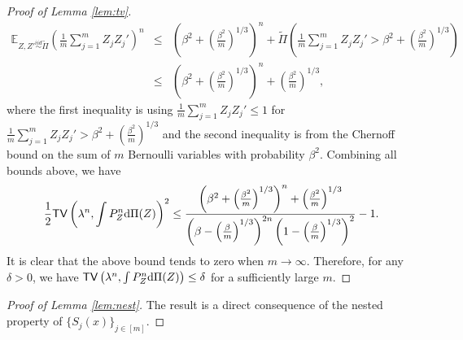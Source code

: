 \begin{proof}[Proof of Lemma \ref{lem:tv}]
\begin{eqnarray*}
 \mathbb{E}_{Z,Z'\stackrel{iid}{\sim} \tilde{\Pi}}\left(\frac{1}{m}\sum_{j=1}^mZ_jZ_j'\right)^n 
&\leq& \left(\beta^2 + \left(\frac{\beta^2}{m}\right)^{1/3}\right)^n + \tilde{\Pi}\left(\frac{1}{m}\sum_{j=1}^mZ_jZ_j'>\beta^2 + \left(\frac{\beta^2}{m}\right)^{1/3}\right) \\
&\leq& \left(\beta^2 + \left(\frac{\beta^2}{m}\right)^{1/3}\right)^n + \left(\frac{\beta^2}{m}\right)^{1/3},
\end{eqnarray*}
where the first inequality is using $\frac{1}{m}\sum_{j=1}^mZ_jZ_j' \leq 1$ for $\frac{1}{m}\sum_{j=1}^mZ_jZ_j' > \beta^2 + \left(\frac{\beta^2}{m}\right)^{1/3}$ and the second inequality is from the Chernoff bound on the sum of $m$ Bernoulli variables with probability $\beta^2$.
Combining all bounds above, we have
$$\frac{1}{2}{\sf TV}\left(\lambda^n,\int P_Z^n \mathrm{d}\Pi(Z)\right)^2\leq \frac{\left(\beta^2 + \left(\frac{\beta^2}{m}\right)^{1/3}\right)^n + \left(\frac{\beta^2}{m}\right)^{1/3}}{\left(\beta-\left(\frac{\beta}{m}\right)^{1/3}\right)^{2n}\left(1-\left(\frac{\beta}{m}\right)^{1/3}\right)^{2}}-1.$$
It is clear that the above bound tends to zero when $m\rightarrow\infty$. Therefore, for any $\delta > 0$, we have
 ${\sf TV}\left(\lambda^n,\int P_Z^n \mathrm{d}\Pi(Z)\right)\leq\delta$ for a sufficiently large $m$.
\end{proof}

\begin{proof}[Proof of Lemma \ref{lem:nest}]
The result is a direct consequence of the nested property of $\{S_j(x)\}_{j\in[m]}$.
\end{proof}




